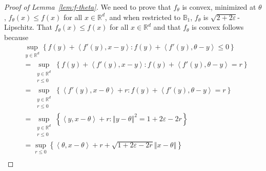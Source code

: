 \documentclass[letter, 12pt]{report}
\newcommand{\R}{\mathbb R}
\newcommand{\ip}[1]{\left \langle #1 \right \rangle}
\newcommand{\ball}{\mathbb{B}}
\newcommand{\norm}[1]{\left \Vert  #1 \right \Vert}
\newcommand{\1}{\mathbf{1}}
\renewcommand{\epsilon}{\varepsilon}
\theoremstyle{plain}
\theoremstyle{definition}
\theoremstyle{remark}
\begin{document}
\begin{proof}[Proof of Lemma~\ref{lem:f-theta}] \label{app:proof:f-theta}
    We need to prove that $f_\theta$ is convex, minimized at $\theta$,
    $f_\theta(x) \leq f(x)$ for all $x \in \R^d$, and
    when restricted to $\ball_1$, $f_\theta$ is $\sqrt{2 + 2\epsilon}$-Lipschitz.
    That $f_\theta(x) \leq f(x)$ for all $x \in \R^d$ and that $f_\theta$ is convex follows because
    \begin{align}
         & \sup_{y \in \R^d} \left\{ f(y) + \ip{f'(y), x - y} : f(y) + \ip{f'(y), \theta - y} \leq 0\right\}  \nonumber                           \\
         & = \sup_{\substack{y \in \R^d                                                                                                           \\ r \leq 0}} \left\{ f(y) + \ip{f'(y), x - y} : f(y) + \ip{f'(y), \theta - y} = r \right\} \nonumber\\
         & = \sup_{\substack{y \in \R^d                                                                                                           \\ r \leq 0}} \left\{ \ip{f'(y), x - \theta} + r : f(y) + \ip{f'(y), \theta - y} = r \right\} \nonumber\\
         & = \sup_{\substack{y \in \R^d                                                                                                           \\ r \leq 0}} \left\{  \ip{y, x - \theta} + r : \norm{y - \theta}^2 = 1 + 2\epsilon - 2r \right\} \nonumber\\
         & = \sup_{r \leq 0} \left\{  \ip{\theta, x - \theta} + r + \sqrt{1 + 2\epsilon - 2r} \norm{x - \theta} \right\} \nonumber                \\

\end{align}
\end{proof}
\end{document}
